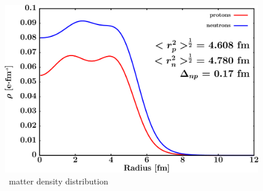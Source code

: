 \begin{figure}[hbtp]
    \centering
    \begin{minipage}{0.70\textwidth}
        \centering
        \includegraphics[width=\linewidth]{figures/sn124_matterDensity.png}
        \caption*{\snFour\ matter density distribution}
        \label{DOMFitData_sn124_matterDensity}
    \end{minipage}
\end{figure}

